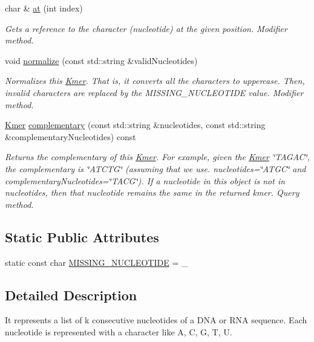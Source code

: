 \begin{DoxyCompactItemize}
char \& \hyperlink{classKmer_a466f592726dc24951744b13ce0692fc1}{at} (int index)
\begin{DoxyCompactList}\small\item\em Gets a reference to the character (nucleotide) at the given position. Modifier method. \end{DoxyCompactList}\item 
void \hyperlink{classKmer_ac4f03c56da85aed417d2139199e7a6bd}{normalize} (const std\+::string \&valid\+Nucleotides)
\begin{DoxyCompactList}\small\item\em Normalizes this \hyperlink{classKmer}{Kmer}. That is, it converts all the characters to uppercase. Then, invalid characters are replaced by the M\+I\+S\+S\+I\+N\+G\+\_\+\+N\+U\+C\+L\+E\+O\+T\+I\+DE value. Modifier method. \end{DoxyCompactList}\item 
\hyperlink{classKmer}{Kmer} \hyperlink{classKmer_a0ae182d0892b67c8cd96de740550032e}{complementary} (const std\+::string \&nucleotides, const std\+::string \&complementary\+Nucleotides) const 
\begin{DoxyCompactList}\small\item\em Returns the complementary of this \hyperlink{classKmer}{Kmer}. For example, given the \hyperlink{classKmer}{Kmer} \char`\"{}\+T\+A\+G\+A\+C\char`\"{}, the complementary is \char`\"{}\+A\+T\+C\+T\+G\char`\"{} (assuming that we use. {\ttfamily nucleotides=\char`\"{}\+A\+T\+G\+C\char`\"{}} and {\ttfamily complementary\+Nucleotides=\char`\"{}\+T\+A\+C\+G\char`\"{}}). If a nucleotide in this object is not in {\ttfamily nucleotides}, then that nucleotide remains the same in the returned kmer. Query method. \end{DoxyCompactList}\end{DoxyCompactItemize}
\subsection*{Static Public Attributes}
\begin{DoxyCompactItemize}
\item 
static const char \hyperlink{classKmer_a4cdc2682181a0435d9fe703316fad091}{M\+I\+S\+S\+I\+N\+G\+\_\+\+N\+U\+C\+L\+E\+O\+T\+I\+DE} = \textquotesingle{}\+\_\+\textquotesingle{}
\end{DoxyCompactItemize}


\subsection{Detailed Description}
It represents a list of k consecutive nucleotides of a D\+NA or R\+NA sequence. Each nucleotide is represented with a character like \textquotesingle{}A\textquotesingle{}, \textquotesingle{}C\textquotesingle{}, \textquotesingle{}G\textquotesingle{}, \textquotesingle{}T\textquotesingle{}, \textquotesingle{}U\textquotesingle{}. 

